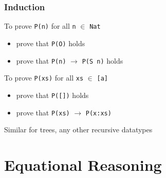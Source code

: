 \documentclass{beamer}
\begin{document}
\begin{frame}[fragile]
    \frametitle {Induction}

To prove \Verb?P(n)? for all \Verb?n? $\in$ \Verb?Nat?
\begin{itemize}
\item prove that \Verb?P(O)? holds
\item prove that \Verb?P(n)? $\rightarrow$ \Verb?P(S n)? holds
\end{itemize}

\vspace{10pt}

To prove \Verb?P(xs)? for all \Verb?xs? $\in$ \Verb?[a]?
\begin{itemize}
\item prove that \Verb?P([])? holds
\item prove that \Verb?P(xs)? $\rightarrow$ \Verb?P(x:xs)?
\end{itemize}

\vspace{10pt}

Similar for trees, any other recursive datatypes

\end{frame}

\section{Equational Reasoning}
\end{document}
